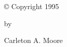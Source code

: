 
\newpage


\par\vspace*{2.5in}

\begin{center}

\copyright\/ Copyright 1995

by

Carleton A. Moore

\end{center}



